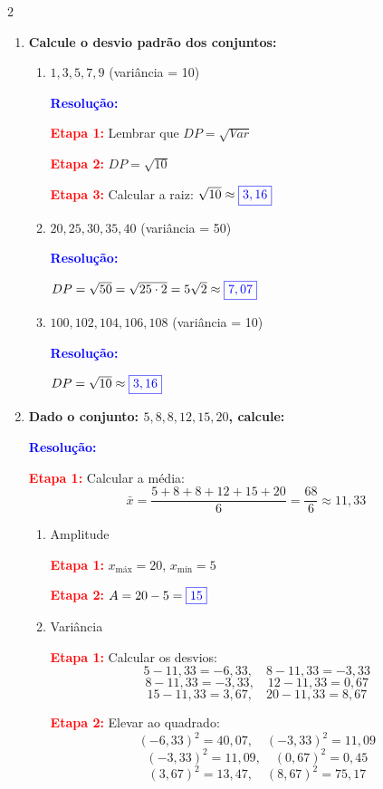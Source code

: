 \documentclass[11pt]{article}
\newcommand{\respostaNum}[1]{\textcolor{blue}{\boxed{#1}}}
\newcommand{\resolucao}{\textbf{\textcolor{blue}{Resolução:}}}
\begin{document}
\begin{multicols}{2}
\begin{enumerate}[leftmargin=*]
\item \textbf{Calcule o desvio padrão dos conjuntos:}

\begin{enumerate}[label=\alph*)]
\item $1, 3, 5, 7, 9$ (variância = 10)

\resolucao

\textbf{\textcolor{red}{Etapa 1:}} Lembrar que $DP = \sqrt{Var}$

\textbf{\textcolor{red}{Etapa 2:}} $DP = \sqrt{10}$

\textbf{\textcolor{red}{Etapa 3:}} Calcular a raiz: $\sqrt{10} \approx \respostaNum{3,16}$

\item $20, 25, 30, 35, 40$ (variância = 50)

\resolucao

$DP = \sqrt{50} = \sqrt{25 \cdot 2} = 5\sqrt{2} \approx \respostaNum{7,07}$

\item $100, 102, 104, 106, 108$ (variância = 10)

\resolucao

$DP = \sqrt{10} \approx \respostaNum{3,16}$
\end{enumerate}

\item \textbf{Dado o conjunto: $5, 8, 8, 12, 15, 20$, calcule:}

\resolucao

\textbf{\textcolor{red}{Etapa 1:}} Calcular a média:
\[
\bar{x} = \frac{5 + 8 + 8 + 12 + 15 + 20}{6} = \frac{68}{6} \approx 11,33
\]

\begin{enumerate}[label=\alph*)]
\item Amplitude

\textbf{\textcolor{red}{Etapa 1:}} $x_{\text{máx}} = 20$, $x_{\text{mín}} = 5$

\textbf{\textcolor{red}{Etapa 2:}} $A = 20 - 5 = \respostaNum{15}$

\item Variância

\textbf{\textcolor{red}{Etapa 1:}} Calcular os desvios:
\[5-11,33 = -6,33,\quad 8-11,33 = -3,33 \] 
\[ 8-11,33 = -3,33, \quad 12-11,33 = 0,67 \]
\[15-11,33 = 3,67,\quad 20-11,33 = 8,67 \]

\textbf{\textcolor{red}{Etapa 2:}} Elevar ao quadrado:
\[(-6,33)^2 = 40,07,\quad (-3,33)^2 = 11,09\]
\[(-3,33)^2 = 11,09, \quad (0,67)^2 = 0,45 \]
\[ (3,67)^2 = 13,47,\quad (8,67)^2 = 75,17 \]


\end{enumerate}
\end{enumerate}
\end{multicols}
\end{document}
